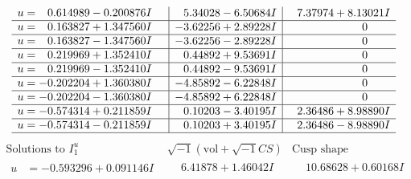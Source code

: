 \documentclass[1p]{elsarticle_modified}
\theoremstyle{definition}
\newcommand{\I}{\sqrt{-1}}
\begin{document}
$$\begin{array}{c|c|c}
\begin{aligned}
u &= \phantom{-}0.614989 - 0.200876 I\end{aligned}
 & \phantom{-}5.34028 - 6.50684 I & \phantom{-}7.37974 + 8.13021 I \\ \hline\begin{aligned}
u &= \phantom{-}0.163827 + 1.347560 I\end{aligned}
 & -3.62256 + 2.89228 I & \phantom{-0.000000 } 0 \\ \hline\begin{aligned}
u &= \phantom{-}0.163827 - 1.347560 I\end{aligned}
 & -3.62256 - 2.89228 I & \phantom{-0.000000 } 0 \\ \hline\begin{aligned}
u &= \phantom{-}0.219969 + 1.352410 I\end{aligned}
 & \phantom{-}0.44892 + 9.53691 I & \phantom{-0.000000 } 0 \\ \hline\begin{aligned}
u &= \phantom{-}0.219969 - 1.352410 I\end{aligned}
 & \phantom{-}0.44892 - 9.53691 I & \phantom{-0.000000 } 0 \\ \hline\begin{aligned}
u &= -0.202204 + 1.360380 I\end{aligned}
 & -4.85892 - 6.22848 I & \phantom{-0.000000 } 0 \\ \hline\begin{aligned}
u &= -0.202204 - 1.360380 I\end{aligned}
 & -4.85892 + 6.22848 I & \phantom{-0.000000 } 0 \\ \hline\begin{aligned}
u &= -0.574314 + 0.211859 I\end{aligned}
 & \phantom{-}0.10203 - 3.40195 I & \phantom{-}2.36486 + 8.98890 I \\ \hline\begin{aligned}
u &= -0.574314 - 0.211859 I\end{aligned}
 & \phantom{-}0.10203 + 3.40195 I & \phantom{-}2.36486 - 8.98890 I\\
 \hline 
 \end{array}$$\newpage$$\begin{array}{c|c|c}  
\text{Solutions to }I^u_{1}& \I (\text{vol} + \sqrt{-1}CS) & \text{Cusp shape}\\
 \hline 
\begin{aligned}
u &= -0.593296 + 0.091146 I\end{aligned}
 & \phantom{-}6.41878 + 1.46042 I & \phantom{-}10.68628 + 0.60168 I \\ \hline\begin{aligned}

\end{aligned}
\end{array}$$
\end{document}

